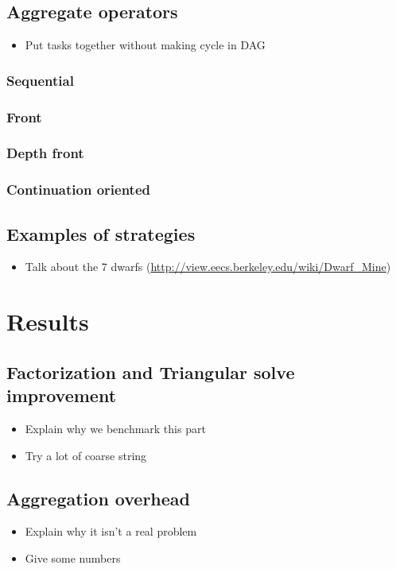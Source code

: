 \documentclass[oneside,12t]{classes/Thesis}
\begin{document}
\subsection{Aggregate operators}
  \begin{itemize}
    \item Put tasks together without making cycle in DAG
  \end{itemize}
\subsubsection{Sequential}
\subsubsection{Front}
\subsubsection{Depth front}
\subsubsection{Continuation oriented}
\subsection{Examples of strategies}
  \begin{itemize}
    \item Talk about the 7 dwarfs (\url{http://view.eecs.berkeley.edu/wiki/Dwarf_Mine})
  \end{itemize}




\section{Results}
\subsection{Factorization and Triangular solve improvement}
  \begin{itemize}
    \item Explain why we benchmark this part
    \item Try a lot of coarse string
  \end{itemize}
\subsection{Aggregation overhead}
  \begin{itemize}
    \item Explain why it isn't a real problem
    \item Give some numbers
  \end{itemize}
\end{document}
